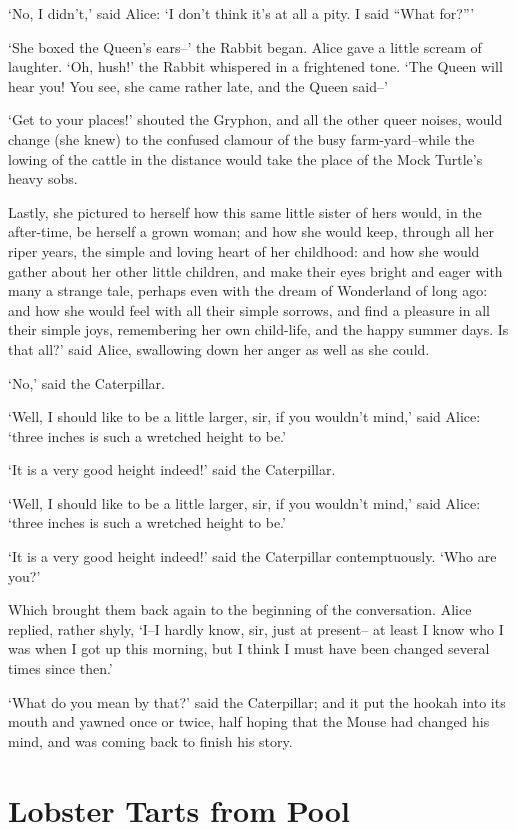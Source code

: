 \documentclass[statementpaper,twoside,openany]{memoir}
\begin{document}
`No, I didn't,' said Alice: `I don't think it's at all a pity. I said ``What for?'''

`She boxed the Queen's ears--' the Rabbit began. Alice gave a little scream of laughter. `Oh, hush!' the Rabbit whispered in a frightened tone. `The Queen will hear you! You see, she came rather late, and the Queen said--'

`Get to your places!' shouted the Gryphon, and all the other queer noises, would change (she knew) to the confused clamour of the busy farm-yard--while the lowing of the cattle in the distance would take the place of the Mock Turtle's heavy sobs.

Lastly, she pictured to herself how this same little sister of hers would, in the after-time, be herself a grown woman; and how she would keep, through all her riper years, the simple and loving heart of her childhood: and how she would gather about her other little children, and make their eyes bright and eager with many a strange tale, perhaps even with the dream of Wonderland of long ago: and how she would feel with all their simple sorrows, and find a pleasure in all their simple joys, remembering her own child-life, and the happy summer days. Is that all?' said Alice, swallowing down her anger as well as she could.

`No,' said the Caterpillar.

`Well, I should like to be a little larger, sir, if you wouldn't mind,' said Alice: `three inches is such a wretched height to be.'

`It is a very good height indeed!' said the Caterpillar.

`Well, I should like to be a little larger, sir, if you wouldn't mind,' said Alice: `three inches is such a wretched height to be.'

`It is a very good height indeed!' said the Caterpillar contemptuously. `Who are you?'

Which brought them back again to the beginning of the conversation. Alice replied, rather shyly, `I--I hardly know, sir, just at present-- at least I know who I was when I got up this morning, but I think I must have been changed several times since then.'

`What do you mean by that?' said the Caterpillar; and it put the hookah into its mouth and yawned once or twice, half hoping that the Mouse had changed his mind, and was coming back to finish his story.

\chapter{Lobster Tarts from Pool}
\end{document}
